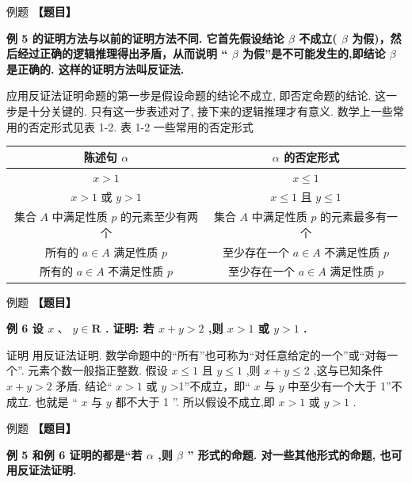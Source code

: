 \documentclass[a4paper,10pt,oneside,fontset=none]{ctexbook}
\renewcommand{\leq}{\leqslant}
\newcounter{example}[chapter]
\newenvironment{example}[1][]{\begin{exBox}{例题}{#1}}{\end{exBox}}
\numberwithin{equation}{chapter}
\begin{document}
\begin{example}
\textbf{【题目】}\par\vspace{0.3em}
\textbf{例 5 的证明方法与以前的证明方法不同. 它首先假设结论 $\beta$ 不成立( $\beta$ 为假)，然后经过正确的逻辑推理得出矛盾，从而说明 “ $\beta$ 为假”是不可能发生的,即结论 $\beta$ 是正确的. 这样的证明方法叫反证法.}\par\vspace{0.3em}
应用反证法证明命题的第一步是假设命题的结论不成立, 即否定命题的结论. 这一步是十分关键的. 只有这一步表述对了, 接下来的逻辑推理才有意义.
数学上一些常用的否定形式见表 1-2.
表 1-2 一些常用的否定形式
\begin{center}
\begin{tabular}{|c|c|}
\hline
陈述句 $\alpha$ & $\alpha$ 的否定形式 \\\hline
$x > 1$ & $x \leq  1$ \\
$x > 1$ 或 $y > 1$ & $x \leq  1$ 且 $y \leq  1$ \\
集合 $A$ 中满足性质 $p$ 的元素至少有两个 & 集合 $A$ 中满足性质 $p$ 的元素最多有一个 \\
所有的 $a \in  A$ 满足性质 $p$ & 至少存在一个 $a \in  A$ 不满足性质 $p$ \\
所有的 $a \in  A$ 不满足性质 $p$ & 至少存在一个 $a \in  A$ 满足性质 $p$ \\
\hline
\end{tabular}
\end{center}
\end{example}

\begin{example}
\textbf{【题目】}\par\vspace{0.3em}
\textbf{例 6 设 $x\text{ 、 }y \in  \mathbf{R}$ . 证明: 若 $x + y > 2$ ,则 $x > 1$ 或 $y > 1$ .}\par\vspace{0.3em}
证明 用反证法证明.
数学命题中的“所有”也可称为“对任意给定的一个”或“对每一个”.
元素个数一般指正整数.
假设 $x \leq  1$ 且 $y \leq  1$ ,则 $x + y \leq  2$ ,这与已知条件 $x + y > 2$ 矛盾.
结论“ $x > 1$ 或 $y$ >1”不成立，即“ $x$ 与 $y$ 中至少有一个大于 1”不成立. 也就是 “ $x$ 与 $y$ 都不大于 1 ”.
所以假设不成立,即 $x > 1$ 或 $y > 1$ .
\end{example}

\begin{example}
\textbf{【题目】}\par\vspace{0.3em}
\textbf{例 5 和例 6 证明的都是“若 $\alpha$ ,则 $\beta$ ” 形式的命题. 对一些其他形式的命题, 也可用反证法证明.}\par\vspace{0.3em}
\end{example}
\end{document}
